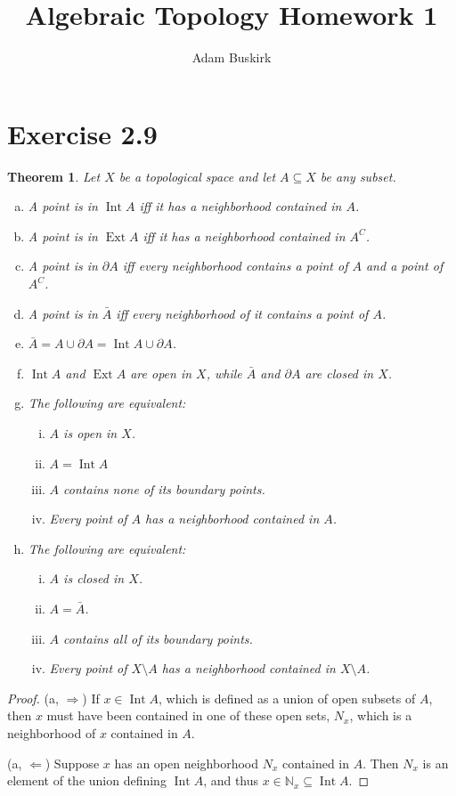 \documentclass{article}
\title{Algebraic Topology Homework 1}
\author{Adam Buskirk}
\newtheorem{theorem}[subsection]{Theorem}
\theoremstyle{definition}
\newcommand{\N}{\mathbb{N}}
\begin{document}
\maketitle
\section{Exercise 2.9}
\begin{theorem}
Let $X$ be a topological space and let $A \subseteq X$ be any subset.
\begin{enumerate}[(a)]
\item A point is in $\operatorname{Int} A$ iff it has a neighborhood contained in $A$.
\item A point is in $\operatorname{Ext} A$ iff it has a neighborhood contained in $A^C$.
\item A point is in $\partial A$ iff every neighborhood contains a point of $A$ and a point of $A^C$.
\item A point is in $\bar{A}$ iff every neighborhood of it contains a point of $A$. 
\item $\bar{A} = A \cup \partial A = \operatorname{Int} A \cup \partial A$.
\item $\operatorname{Int} A$ and $\operatorname{Ext} A$ are open in $X$, while $\bar{A}$
    and $\partial A$ are closed in $X$.
\item The following are equivalent:
    \begin{enumerate}[(i)]
    \item $A$ is open in $X$.
    \item $A=\operatorname{Int} A$
    \item $A$ contains none of its boundary points.
    \item Every point of $A$ has a neighborhood contained in $A$.
    \end{enumerate}
\item The following are equivalent:
    \begin{enumerate}[(i)]
    \item $A$ is closed in $X$.
    \item $A=\bar{A}$.
    \item $A$ contains all of its boundary points.
    \item Every point of $X\setminus A$ has a neighborhood 
        contained in $X\setminus A$.
    \end{enumerate}
\end{enumerate}
\end{theorem}
\begin{proof}
(a, $\Rightarrow$) If $x \in \operatorname{Int} A$, which is defined as a 
union of open subsets of $A$, then $x$ must have been contained in one of 
these open sets, $N_x$, which is a neighborhood of $x$ contained in $A$.

(a, $\Leftarrow$) Suppose $x$ has an open neighborhood $N_x$ contained in $A$. 
Then $N_x$ is an element of the union defining $\operatorname{Int} A$, and 
thus $ x \in \N_x \subseteq \operatorname{Int} A$.


\end{proof}
\end{document}
